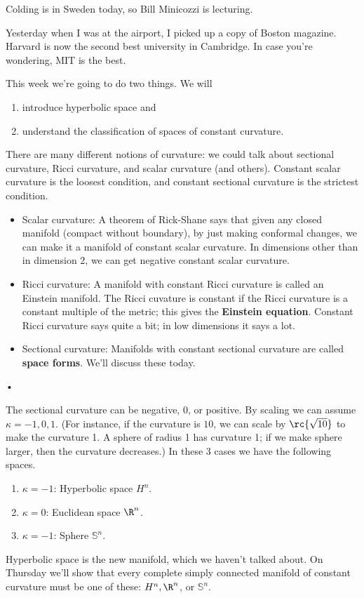 Colding is in Sweden today, so Bill Minicozzi is lecturing.

Yesterday when I was at the airport, I picked up a copy of Boston magazine. Harvard is now the second best university in Cambridge. In case you're wondering, MIT is the best.

This week we're going to do two things. We will
\begin{enumerate}
\item
 introduce hyperbolic space and
\item
understand the classification of spaces of constant curvature. 
\end{enumerate}
There are many different notions of curvature: we could talk about sectional curvature, Ricci curvature, and scalar curvature (and others). Constant scalar curvature is the loosest condition, and constant sectional curvature is the strictest condition.
\begin{itemize}
\item Scalar curvature: A theorem of Rick-Shane says that given any closed manifold (compact without boundary), by just making conformal changes, we can make it a manifold of constant scalar curvature. In dimensions other than in dimension 2, we can get negative constant scalar curvature.
\item Ricci curvature:
A manifold with constant Ricci curvature is called an Einstein manifold. The Ricci cuvature is constant if the Ricci curvature is a constant multiple of the metric; this gives the \textbf{Einstein equation}. Constant Ricci curvature says quite a bit; in low dimensions it says a lot.
\item Sectional curvature:
Manifolds with constant sectional curvature are called \textbf{space forms}. We'll discuss these today.
\end{itemize}•

The sectional curvature can be negative, 0, or positive. By scaling we can assume $\kappa=-1,0,1$. (For instance, if the curvature is $10$, we can scale by $\rc{\sqrt{10}}$ to make the curvature 1. A sphere of radius 1 has curvature 1; if we make sphere larger, then the curvature decreases.) In these 3 cases we have the following spaces.
\begin{enumerate}
\item $\kappa=-1$: Hyperbolic space $H^n$.
\item $\kappa=0$: Euclidean space $\R^n$.
\item $\kappa=-1$: Sphere $\mathbb S^n$.
\end{enumerate}
Hyperbolic space is the new manifold, which we haven't talked about. On Thursday we'll show that every complete simply connected manifold of constant curvature must be one of these: $H^n, \R^n$, or $\mathbb S^n$.

